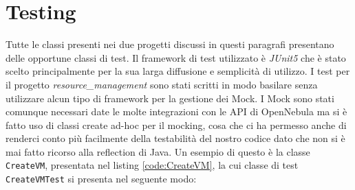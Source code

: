 \section{Testing}
Tutte le classi presenti nei due progetti discussi in questi paragrafi presentano delle opportune classi di test. Il framework di test utilizzato è \emph{JUnit5}\cite{junit5} che è stato scelto principalmente per la sua larga diffusione e semplicità di utilizzo.\medbreak
I test per il progetto \emph{resource\_management} sono stati scritti in modo basilare senza utilizzare alcun tipo di framework per la gestione dei Mock. I Mock sono stati comunque necessari date le molte integrazioni con le API di OpenNebula ma si è fatto uso di classi create ad-hoc per il mocking, cosa che ci ha permesso anche di renderci conto più facilmente della testabilità del nostro codice dato che non si è mai fatto ricorso alla reflection di Java.\medbreak
Un esempio di questo è la classe \texttt{CreateVM}, presentata nel listing \ref{code:CreateVM}, la cui classe di test \texttt{CreateVMTest} si presenta nel seguente modo:

